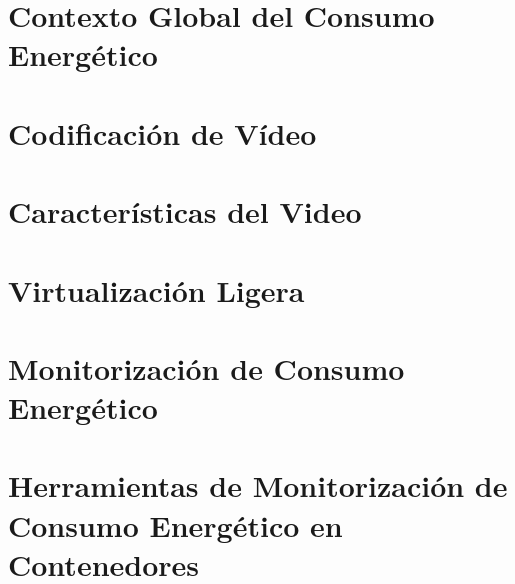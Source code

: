 \section{Contexto Global del Consumo Energético}


\section{Codificación de Vídeo}


\section{Características del Video}


\section{Virtualización Ligera}


\section{Monitorización de Consumo Energético}


\section{Herramientas de Monitorización de Consumo Energético en Contenedores} \label{sec:arte-herramientas}


